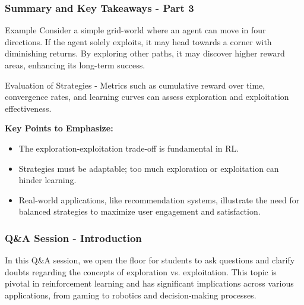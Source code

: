 \documentclass[aspectratio=169]{beamer}
\begin{document}
\begin{frame}[fragile]
    \frametitle{Summary and Key Takeaways - Part 3}
    \begin{block}{Example}
        Consider a simple grid-world where an agent can move in four directions. If the agent solely exploits, it may head towards a corner with diminishing returns. By exploring other paths, it may discover higher reward areas, enhancing its long-term success.
    \end{block}

    \begin{block}{Evaluation of Strategies}
        - Metrics such as cumulative reward over time, convergence rates, and learning curves can assess exploration and exploitation effectiveness.
        
        \textbf{Key Points to Emphasize:}
        \begin{itemize}
            \item The exploration-exploitation trade-off is fundamental in RL.
            \item Strategies must be adaptable; too much exploration or exploitation can hinder learning.
            \item Real-world applications, like recommendation systems, illustrate the need for balanced strategies to maximize user engagement and satisfaction.
        \end{itemize}
    \end{block}
\end{frame}

\begin{frame}[fragile]
    \frametitle{Q\&A Session - Introduction}
    In this Q\&A session, we open the floor for students to ask questions and clarify doubts regarding the concepts of exploration vs. exploitation. This topic is pivotal in reinforcement learning and has significant implications across various applications, from gaming to robotics and decision-making processes.
\end{frame}
\end{document}
